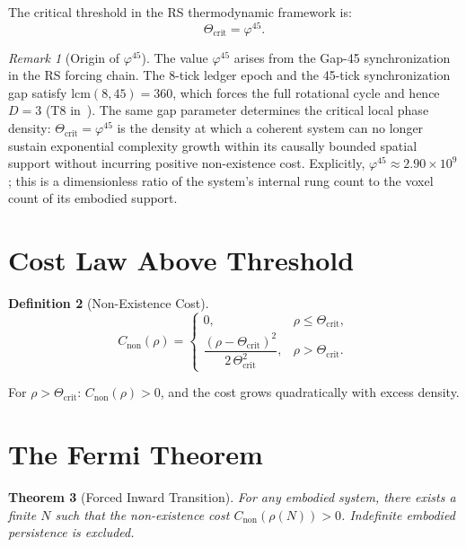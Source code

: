 \documentclass[12pt,a4paper]{article}
\newtheorem{theorem}{Theorem}[section]
\theoremstyle{definition}
\newtheorem{definition}[theorem]{Definition}
\theoremstyle{remark}
\newtheorem{remark}[theorem]{Remark}
\begin{document}
The critical threshold in the RS thermodynamic framework is:
\begin{equation}
  \Theta_{\mathrm{crit}} = \varphi^{45}.
\end{equation}
\begin{remark}[Origin of $\varphi^{45}$]
\label{rem:gap45}
The value $\varphi^{45}$ arises from the Gap-45 synchronization in
the RS forcing chain.  The 8-tick ledger epoch and the 45-tick
synchronization gap satisfy $\mathrm{lcm}(8,45)=360$, which forces
the full rotational cycle and hence $D=3$ (T8 in~\cite{RS_Axioms}).
The same gap parameter determines the critical local phase density:
$\Theta_{\mathrm{crit}} = \varphi^{45}$ is the density at which
a coherent system can no longer sustain exponential complexity growth
within its causally bounded spatial support without incurring
positive non-existence cost.  Explicitly,
$\varphi^{45} \approx 2.90 \times 10^9$; this is a dimensionless
ratio of the system's internal rung count to the voxel count of
its embodied support.
\end{remark}

\section{Cost Law Above Threshold}
\label{sec:cost}

\begin{definition}[Non-Existence Cost]
\begin{equation}
  C_{\mathrm{non}}(\rho) = \begin{cases}
  0, & \rho \leq \Theta_{\mathrm{crit}}, \\[4pt]
  \dfrac{(\rho - \Theta_{\mathrm{crit}})^2}
  {2\,\Theta_{\mathrm{crit}}^2}, & \rho > \Theta_{\mathrm{crit}}.
  \end{cases}
\end{equation}
\end{definition}

For $\rho > \Theta_{\mathrm{crit}}$: $C_{\mathrm{non}}(\rho) > 0$,
and the cost grows quadratically with excess density.

\section{The Fermi Theorem}
\label{sec:theorem}

\begin{theorem}[Forced Inward Transition]
For any embodied system, there exists a finite $N$ such that the
non-existence cost $C_{\mathrm{non}}(\rho(N)) > 0$.  Indefinite
embodied persistence is excluded.
\end{theorem}
\end{document}
